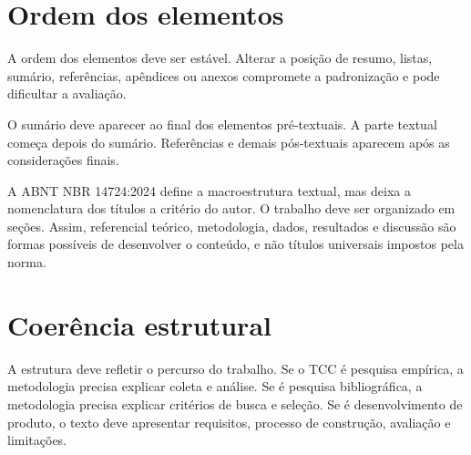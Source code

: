 \section{Ordem dos elementos}

A ordem dos elementos deve ser estável. Alterar a posição de resumo, listas, sumário, referências, apêndices ou anexos compromete a padronização e pode dificultar a avaliação.

O sumário deve aparecer ao final dos elementos pré-textuais. A parte textual começa depois do sumário. Referências e demais pós-textuais aparecem após as considerações finais.

A ABNT NBR 14724:2024 define a macroestrutura textual, mas deixa a nomenclatura dos títulos a critério do autor. O trabalho deve ser organizado em seções. Assim, referencial teórico, metodologia, dados, resultados e discussão são formas possíveis de desenvolver o conteúdo, e não títulos universais impostos pela norma.

\section{Coerência estrutural}

A estrutura deve refletir o percurso do trabalho. Se o TCC é pesquisa empírica, a metodologia precisa explicar coleta e análise. Se é pesquisa bibliográfica, a metodologia precisa explicar critérios de busca e seleção. Se é desenvolvimento de produto, o texto deve apresentar requisitos, processo de construção, avaliação e limitações.

